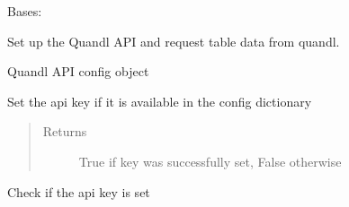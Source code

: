 \documentclass[letterpaper,10pt,english]{sphinxmanual}
\begin{document}
\begin{fulllineitems}
\label{\detokenize{dalio.external:dalio.external.QuandlAPI}}
Bases: {\hyperref[\detokenize{dalio.external:dalio.external.external.External}]{}}

Set up the Quandl API and request table data from quandl.

\begin{fulllineitems}
\label{\detokenize{dalio.external:dalio.external.QuandlAPI._quandl_conf}}
Quandl API config object

\end{fulllineitems}


\begin{fulllineitems}
\label{\detokenize{dalio.external:dalio.external.QuandlAPI.authenticate}}
Set the api key if it is available in the config dictionary
\begin{quote}\begin{description}
\item[{Returns}] \leavevmode
True if key was successfully set, False otherwise

\end{description}\end{quote}

\end{fulllineitems}


\begin{fulllineitems}
\label{\detokenize{dalio.external:dalio.external.QuandlAPI.check}}
Check if the api key is set

\end{fulllineitems}


\end{fulllineitems}
\end{document}

